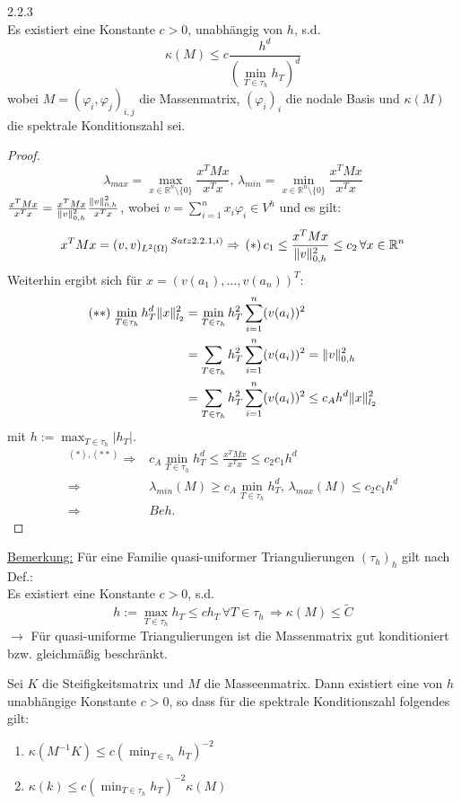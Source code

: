 \begin{satz}{2.2.3}\\
Es existiert eine Konstante $c>0$, unabhängig von $h$, s.d. 
\[\kappa (M) \leq c \frac{h^d}{(\min_{T \in \tau_h} h_T)^d} \]
wobei $M=(\varphi_i,\varphi_j)_{i,j}$ die Massenmatrix, $(\varphi_i)_i$ die nodale Basis und $\kappa (M)$ die spektrale Konditionszahl sei.
\end{satz}
\begin{proof}
\[\lambda_{max}=\max_{x  \in \mathbb{R}^n\setminus \{ 0 \}} \frac{x^TMx}{x^Tx} , \, \lambda_{min}=\min_{x  \in \mathbb{R}^n\setminus \{ 0 \}} \frac{x^TMx}{x^Tx} \]
$ \frac{x^TMx}{x^Tx}=\frac{x^TMx}{\|v\|^2_{0,h}}\frac{\|v\|^2_{0,h}}{x^Tx}$, wobei $v=\sum_{i=1}^n x_i\varphi_i \in V^h$ und es gilt:
\[x^TMx=(v,v)_{L^2(\Omega)}\, ^{Satz 2.2.1,i)} \Rightarrow\, (*) \, c_1 \leq \frac{x^TMx}{\|v\|^2_{0,h}} \leq c_2 \, \forall x \in \mathbb{R}^n \]
Weiterhin ergibt sich für $x=(v(a_1),\dots,v(a_n))^T$:
\begin{align*}
(**) \, \min_{T \in \tau_h} h^d_T \|x\|^2_{l_2} &= \min_{T \in \tau_h} h^2_T \sum_{i=1}^n (v(a_i))^2 \\
&= \sum_{T \in \tau_h} h^2_T \sum_{i=1}^n (v(a_i))^2 = \|v\|^2_{0,h} \\
&=  \sum_{T \in \tau_h} h^2_T \sum_{i=1}^n (v(a_i))^2 \leq c_A h^d \|x\|^2_{l_2}
\end{align*}
mit $h:= \max_{T \in \tau_h} |h_T| $.
\begin{align*}
^{(*),(**)}\Rightarrow& c_A \min_{T \in \tau_h} h^d_T \leq \frac{x^TMx}{x^Tx} \leq c_2c_1 h^d\\
\Rightarrow & \lambda_{min}(M) \geq c_A \min_{T \in \tau_h} h^d_T, \, \lambda_{max} (M) \leq c_2c_1 h^d \\
\Rightarrow & Beh. 
\end{align*}
\end{proof}
\underline{Bemerkung:} Für eine Familie quasi-uniformer Triangulierungen $(\tau_h)_h$ gilt nach Def.:\\
Es existiert eine Konstante $c>0$, s.d. 
\[ h:= \max_{T \in \tau_h} h_T \leq c h_T \, \forall  T \in \tau_h \, \Rightarrow \kappa (M) \leq \tilde C \]
$\rightarrow$ Für quasi-uniforme Triangulierungen ist die Massenmatrix gut konditioniert bzw. gleichmäßig beschränkt.\\

\begin{satz}%
  Sei $K$ die Steifigkeitsmatrix und $M$ die Masseenmatrix. Dann existiert eine von $h$ unabhängige Konstante $c>0$, so dass für die spektrale Konditionszahl folgendes gilt:
  \begin{enumerate}
    \item $\kappa(M^{-1}K) \leq c(\min_{T\in\tau_h} h_T)^{-2}$
    \item $\kappa(k) \leq c(\min_{T\in\tau_h} h_T)^{-2} \kappa(M)$
  \end{enumerate}
\end{satz}

